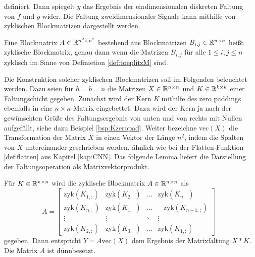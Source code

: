 definiert.
Dann spiegelt $y$ das Ergebnis der eindimensionalen diskreten Faltung von $f$ und $g$ wider. Die Faltung zweidimensionaler Signale kann mithilfe von zyklischen Blockmatrizen dargestellt werden.
\begin{defi}
    \label{def:double_circ}
    Eine Blockmatrix $A \in \mathbb{R}^{n^2 \times n^2}$ bestehend aus Blockmatrizen $B_{i,j} \in \mathbb{R}^{n \times n}$ heißt zyklische Blockmatrix, genau dann wenn die Matrizen $B_{i,j}$ für alle $ 1 \leq i, j \leq n$ zyklisch im Sinne von Definietion \ref{def:toeplitzM} sind.
\end{defi}

Die Konstruktion solcher zyklischen Blockmatrizen soll im Folgenden beleuchtet werden. Dazu  seien für $h=b=n$ die Matrizen $X \in \mathbb{R}^{n \times n}$ und $K \in \mathbb{R}^{k \times k}$ einer Faltungschicht gegeben. Zunächst wird der Kern $K$ mithilfe des zero paddings ebenfalls in eine $n \times n$-Matrix eingebettet. Dazu wird der Kern ja nach der gewünschten Größe des Faltungsergebnis von unten und von rechts mit Nullen aufgefüllt, siehe dazu Beispiel \ref{bsp:Kzeropad}.
Weiter bezeichne $\mathrm{vec}(X)$ die Transformation der Matrix $X$ in einen Vektor der Länge $n^2$, indem die Spalten von $X$ untereinander geschrieben werden, ähnlich wie bei der Flatten-Funktion \ref{def:flatten} aus Kapitel \ref{kap:CNN}. Das folgende Lemma liefert die Darstellung der Faltungsoperation als Matrixvektorprodukt.

\begin{lem}
    Für $K \in \mathbb{R}^{n \times n}$ wird die zyklische Blockmatrix $A \in \mathbb{R}^{n \times n}$ als
    \begin{equation*}
        A=\begin{bmatrix}
            \mathrm{zyk}(K_{1,:}) &\mathrm{zyk}(K_{2,:}) &\ldots &\mathrm{zyk}(K_{n,:}) \\
            \mathrm{zyk}(K_{n,:}) &\mathrm{zyk}(K_{1,:}) &\ldots & \; \; \;\mathrm{zyk}(K_{n-1,:})\\
            \vdots &\vdots &\ddots &\vdots\\
            \mathrm{zyk}(K_{2,:}) &\mathrm{zyk}(K_{3,:}) &\ldots &\mathrm{zyk}(K_{1,:})
        \end{bmatrix}
    \end{equation*}
    gegeben. Dann entspricht $Y=A \mathrm{vec}(X)$ dem Ergebnis der Matrixfaltung $X \ast K$. Die Matrix $A$ ist dünnbesetzt. 
\end{lem}

